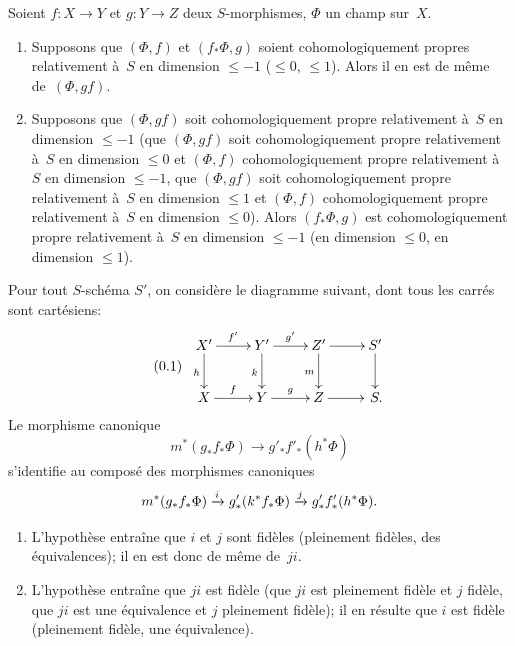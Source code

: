 \begin{proposition}
\label{XIII.1.6}
Soient $f \colon X \to Y$ et $g \colon Y \to Z$ deux $S$-morphismes,
$\Phi$ un champ sur~$X$.
\begin{enumerate}
\item[1)] Supposons que $(\Phi,f)$ et $(f_* \Phi, g)$ soient
cohomologiquement propres relativement \`a~$S$ en dimension
$\leqslant -1$ (\resp $\leqslant 0$, \resp $\leqslant 1$). Alors il en
est de m\^eme de~$(\Phi, gf)$.
\item[2)] Supposons que $(\Phi, gf)$ soit cohomologiquement propre
relativement \`a~$S$ en dimension $\leqslant -1$ (\resp que $(\Phi,
gf)$ soit cohomologiquement propre relativement \`a~$S$ en dimension
$\leqslant 0$ et $(\Phi,f)$ cohomologiquement propre relativement
\`a~$S$ en dimension $\leqslant -1$, \resp que $(\Phi, gf)$ soit
cohomologiquement propre relativement \`a~$S$ en dimension
$\leqslant 1$ et $(\Phi, f)$ cohomologiquement propre relativement
\`a~$S$ en dimension $\leqslant 0$). Alors $(f_* \Phi, g)$ est
cohomologiquement propre relativement \`a~$S$ en dimension
$\leqslant -1$ (\resp en dimension $\leqslant 0$, \resp en dimension
$\leqslant 1$).
\end{enumerate}
\end{proposition}

Pour tout $S$-sch\'ema $S'$, on consid\`ere le diagramme suivant,
dont tous les carr\'es sont cart\'esiens:
\begin{equation*}
\label{eq:XIII.1.6.1}
\tag{\thesubsection.1}
\begin{array}{c}
\xymatrix{{X'}\ar[r]^{f'}\ar[d]_h&{Y'}\ar[r]^{g'}\ar[d]_k&{Z'}\ar[r]\ar[d]_{m}&{S'}\ar[d]\\{X}\ar[r]^f&{Y}\ar[r]^g&{Z}\ar[r]&{\,S.}}
\end{array}
\end{equation*}
Le
morphisme canonique
$$
m^* (g_* f_* \Phi) \to g'_* f'_* (h^* \Phi)
$$
s'identifie
au compos\'e des morphismes canoniques
$$
m^*(g_* f_* \Phi) \xrightarrow{i} g'_*(k^*f_* \Phi) \xrightarrow{j} g'_* f'_*(h^* \Phi).
$$
\begin{enumerate}
\item[1)] L'hypoth\`ese entra\^ine que $i$ et $j$ sont
fid\`eles (\resp pleinement fid\`eles, \resp des
\'equi\-va\-lences); il en est donc de m\^eme de~$ji$.
\item[2)] L'hypoth\`ese entra\^ine que $ji$ est fid\`ele
(\resp que $ji$ est
pleinement
fid\`ele et $j$ fid\`ele, \resp que $ji$ est une \'equivalence
et $j$ pleinement fid\`ele); il en r\'esulte que $i$ est
fid\`ele (\resp pleinement fid\`ele, \resp une \'equivalence).
\end{enumerate}

